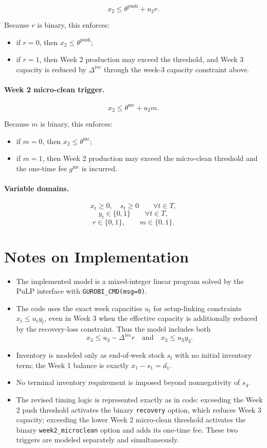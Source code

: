 \[
x_2 \le \theta^{\mathrm{push}} + u_2 r .
\]

Because $r$ is binary, this enforces:
\begin{itemize}
    \item if $r=0$, then $x_2 \le \theta^{\mathrm{push}}$;
    \item if $r=1$, then Week 2 production may exceed the threshold, and Week 3 capacity is reduced by $\Delta^{\mathrm{rec}}$ through the week-3 capacity constraint above.
\end{itemize}

\paragraph{Week 2 micro-clean trigger.}

\[
x_2 \le \theta^{\mathrm{mc}} + u_2 m .
\]

Because $m$ is binary, this enforces:
\begin{itemize}
    \item if $m=0$, then $x_2 \le \theta^{\mathrm{mc}}$;
    \item if $m=1$, then Week 2 production may exceed the micro-clean threshold and the one-time fee $g^{\mathrm{mc}}$ is incurred.
\end{itemize}

\paragraph{Variable domains.}
\[
x_t \ge 0,\quad s_t \ge 0 \qquad \forall t\in T,
\]
\[
y_t \in \{0,1\} \qquad \forall t\in T,
\]
\[
r\in\{0,1\},\qquad m\in\{0,1\}.
\]

\section*{Notes on Implementation}

\begin{itemize}
    \item The implemented model is a mixed-integer linear program solved by the PuLP interface with \texttt{GUROBI\_CMD(msg=0)}.
    \item The code uses the exact week capacities $u_t$ for setup-linking constraints $x_t \le u_t y_t$, even in Week 3 when the effective capacity is additionally reduced by the recovery-loss constraint. Thus the model includes both
    \[
    x_3 \le u_3 - \Delta^{\mathrm{rec}} r
    \quad\text{and}\quad
    x_3 \le u_3 y_3.
    \]
    \item Inventory is modeled only as end-of-week stock $s_t$ with no initial inventory term; the Week 1 balance is exactly $x_1-s_1=d_1$.
    \item No terminal inventory requirement is imposed beyond nonnegativity of $s_4$.
    \item The revised timing logic is represented exactly as in code: exceeding the Week 2 push threshold activates the binary \texttt{recovery} option, which reduces Week 3 capacity; exceeding the lower Week 2 micro-clean threshold activates the binary \texttt{week2\_microclean} option and adds its one-time fee. These two triggers are modeled separately and simultaneously.
\end{itemize}
